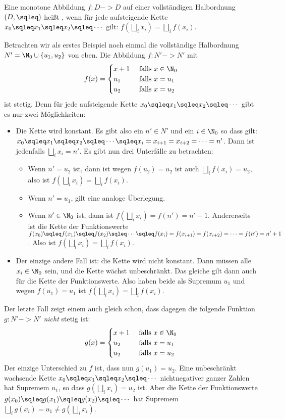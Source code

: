 Eine monotone Abbildung $f:D->D$ auf einer vollständigen Halbordnung
$(D,\sqleq)$ heißt , wenn für jede aufsteigende
Kette $x_0\sqleq x_1\sqleq x_2 \sqleq \cdots$ gilt: $f(\bigsqcup_i x_i)
= \bigsqcup_i f(x_i)$.

Betrachten wir als erstes Beispiel noch einmal die vollständige
Halbordnung $N'=\N_0\cup\{u_1,u_2\}$ von eben. Die Abbildung
$f:N'->N'$ mit
\[
f(x) =
\begin{cases}
  x+1 & \text{ falls } x\in \N_0\\
  u_1 & \text{ falls } x=u_1\\
  u_2 & \text{ falls } x=u_2\\
\end{cases}
\]
ist stetig. Denn für jede aufsteigende Kette $x_0\sqleq x_1\sqleq x_2
\sqleq \cdots$ gibt es nur zwei Möglichkeiten:
\begin{itemize}
\item Die Kette wird konstant. Es gibt also ein $n'\in N'$ und ein
  $i\in\N_0$ so dass gilt: $x_0\sqleq x_1\sqleq x_2 \sqleq \cdots
  \sqleq x_i = x_{i+1} = x_{i+2} = \cdots = n'$. Dann ist jedenfalls
  $\bigsqcup_i x_i = n'$. Es gibt nun drei Unterfälle zu betrachten:

  \begin{itemize}
  \item Wenn $n'=u_2$ ist, dann ist wegen $f(u_2)=u_2$ ist auch
    $\bigsqcup_i f(x_i)=u_2$, also ist $f(\bigsqcup_i x_i) =\bigsqcup_i
    f(x_i)$.
  \item Wenn $n'=u_1$, gilt eine analoge Überlegung.
  \item Wenn $n'\in\N_0$ ist, dann ist $f(\bigsqcup_i x_i) =
    f(n')=n'+1$.  Andererseits ist die Kette der Funktionswerte
    $f(x_0)\sqleq f(x_1)\sqleq f(x_2) \sqleq \cdots \sqleq f(x_i) =
    f(x_{i+1}) = f(x_{i+2}) = \cdots = f(n')=n'+1$. Also ist
    $f(\bigsqcup_i x_i) =\bigsqcup_i f(x_i)$.
  \end{itemize}
\item Der einzige andere Fall ist: die Kette wird nicht konstant. Dann
  müssen alle $x_i\in\N_0$ sein, und die Kette wächst
  unbeschränkt. Das gleiche gilt dann auch für die Kette der
  Funktionswerte. Also haben beide als Supremum $u_1$ und wegen
  $f(u_1)=u_1$ ist $f(\bigsqcup_i x_i) =\bigsqcup_i f(x_i)$.
\end{itemize}
%
Der letzte Fall zeigt einem auch gleich schon, dass dagegen die
folgende Funktion $g:N'->N'$ \emph{nicht} stetig ist:
\[
g(x) =
\begin{cases}
  x+1 & \text{ falls } x\in \N_0\\
  u_2 & \text{ falls } x=u_1\\
  u_2 & \text{ falls } x=u_2\\
\end{cases}
\]
Der einzige Unterschied zu $f$ ist, dass nun $g(u_1)=u_2$.  Eine
unbeschränkt wachsende Kette $x_0\sqleq x_1\sqleq x_2 \sqleq \cdots$
nichtnegativer ganzer Zahlen hat Supremem $u_1$, so dass $g(\bigsqcup_i
x_i)=u_2$ ist.  Aber die Kette der Funktionswerte $g(x_0)\sqleq
g(x_1)\sqleq g(x_2) \sqleq \cdots$ hat Supremem
$\bigsqcup_i g(x_i)=u_1\not=g(\bigsqcup_i x_i)$.

